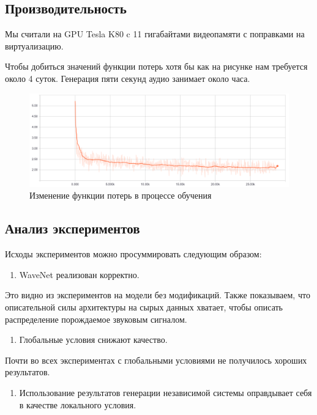 \documentclass[../diploma.tex]{subfiles}
\begin{document}
\subsection{Производительность}

Мы считали на GPU Tesla K80 c 11 гигабайтами видеопамяти с поправками на виртуализацию.

Чтобы добиться значений функции потерь хотя бы как на рисунке \label{fig:perf} нам требуется около 4 суток. Генерация пяти секунд аудио занимает около часа.

\begin{figure}[h!]
  \includegraphics[scale=0.36]{img/perf}
  \caption{Изменение функции потерь в процессе обучения}
  \label{fig:perf}
\end{figure}

\subsection{Анализ экспериментов}

Исходы экспериментов можно просуммировать следующим образом:

\begin{enumerate}[resume]
    \item WaveNet реализован корректно.
\end{enumerate}

Это видно из экспериментов на модели без модификаций. Также показываем, что описательной силы архитектуры на сырых данных хватает, чтобы описать распределение порождаемое звуковым сигналом.

\begin{enumerate}[resume]
    \item Глобальные условия снижают качество.
\end{enumerate}

Почти во всех экспериментах с глобальными условиями не получилось хороших результатов.

\begin{enumerate}[resume]
    \item Использование результатов генерации независимой системы оправдывает себя  в качестве локального условия.
\end{enumerate}
\end{document}
